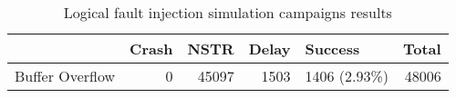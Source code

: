 \begin{table}[t]
\centering
\caption{Logical fault injection simulation campaigns results}
\label{table:end_sim_by_status_wop_single_bitflip_spatial}
\begin{tabular}{lrrrlr}
\toprule
 & Crash & NSTR & Delay & Success & Total \\
\midrule
Buffer Overflow & 0 & 45097 & 1503 & 1406 (2.93\%) & 48006 \\
\bottomrule
\end{tabular}
\end{table}
